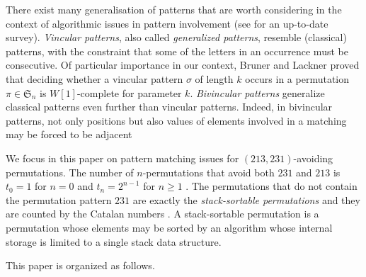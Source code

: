 \documentclass[a4paper]{llncs}
\newcommand{\ptext}{\pi}
\newcommand{\pmotif}{\sigma}
\newcounter{num}
\begin{document}
	There exist many generalisation of patterns that are worth considering
	in the context of algorithmic issues in pattern involvement
	(see \cite{Kitaev:book:2011} for an up-to-date survey).
	\emph{Vincular patterns}, also called 
	\emph{generalized patterns},
	resemble (classical) patterns, with the constraint that some of the letters in
	an occurrence must be consecutive.
	Of particular importance in our context,
	Bruner and Lackner \cite{Bruner:Lackner:SWAT:2012}
	proved that deciding whether a vincular pattern
	$\sigma$ of length $k$ occurs in a permutation
	$\pi \in \mathfrak{S}_n$ is $W[1]$-complete for
	parameter $k$.
	\emph{Bivincular patterns} generalize classical patterns even further 
	than vincular
	patterns. Indeed, in bivincular patterns,
	not only positions but also values
	of elements involved in a matching may be forced to be adjacent

	We focus in this paper on pattern matching issues for
	$(213,231)$-avoiding permutations.
	The number of $n$-permutations that avoid both 
	$231$ and $213$ is 
	$t_0 = 1$ for $n = 0$ and 
	$t_n =2^{n−1}$ for $n\geq 1$ \cite{Simion:Schmidt:EJC:1985}.
	The permutations that do not contain the permutation pattern $231$
	are exactly the \emph{stack-sortable permutations} and they are counted by 
	the Catalan numbers \cite{Knuth:1997:ACP:260999}.
	A stack-sortable permutation is a permutation whose elements may be sorted by 
	an algorithm whose internal storage is limited to a single stack data structure.

	This paper is organized as follows.
	
%	 
%
%	
\end{document}
